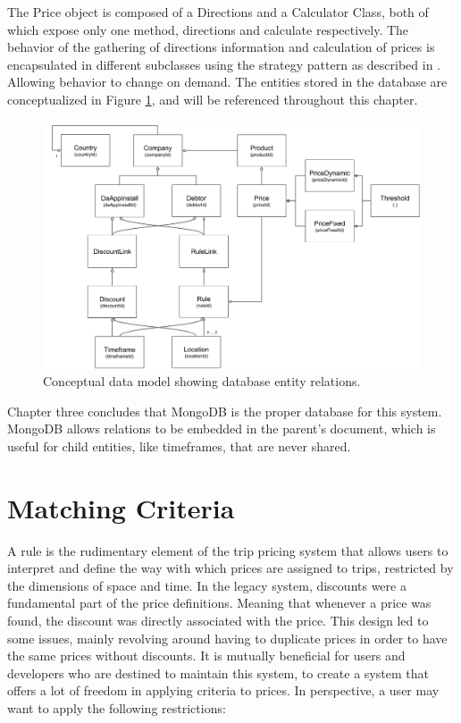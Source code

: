 The Price object is composed of a Directions and a Calculator Class, both of which expose only one method, directions and calculate respectively. The behavior of the gathering of directions information and calculation of prices is encapsulated in different subclasses using the strategy pattern as described in \cite{gof}. Allowing behavior to change on demand. The entities stored in the database are conceptualized in Figure \ref{fig:Data Model}, and will be referenced throughout this chapter.

\begin{figure}[H]
	\centering
	\includegraphics[width=1\textwidth]{DataModel}
	\caption[Data Model]{Conceptual data model showing database entity relations.}
	\label{fig:Data Model}
\end{figure}

Chapter three concludes that MongoDB is the proper database for this system. MongoDB allows relations to be embedded in the parent's document, which is useful for child entities, like timeframes, that are never shared.

\section{Matching Criteria}
A rule is the rudimentary element of the trip pricing system that allows users to interpret and define the way with which prices are assigned to trips, restricted by the dimensions of space and time. In the legacy system, discounts were a fundamental part of the price definitions. Meaning that whenever a price was found, the discount was directly associated with the price. This design led to some issues, mainly revolving around having to duplicate prices in order to have the same prices without discounts. It is mutually beneficial for users and developers who are destined to maintain this system, to create a system that offers a lot of freedom in applying criteria to prices. In perspective, a user may want to apply the following restrictions:

